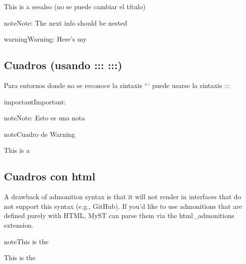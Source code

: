 \documentclass[letterpaper,10pt,english]{jupyterBook}
\begin{document}
\nopagebreak


\sphinxAtStartPar
This is a seealso (no se puede cambiar el título)



\begin{sphinxadmonition}{note}{Note:}
\sphinxAtStartPar
The next info should be nested

\begin{sphinxadmonition}{warning}{Warning:}
\sphinxAtStartPar
Here’s my 
\end{sphinxadmonition}
\end{sphinxadmonition}


\subsection{Cuadros (usando ::: :::)}
\label{\detokenize{docs/02_01_Cuadros:cuadros-usando}}
\sphinxAtStartPar
Para entornos donde no se reconoce la sintaxis
```
puede usarse la sintaxis
:::

\begin{sphinxadmonition}{important}{Important:}
\begin{sphinxadmonition}{note}{Note:}
\sphinxAtStartPar
Esto es una nota
\end{sphinxadmonition}
\end{sphinxadmonition}

\begin{sphinxadmonition}{note}{Cuadro de Warning}

\sphinxAtStartPar
This is a 
\end{sphinxadmonition}


\subsection{Cuadros con html}
\label{\detokenize{docs/02_01_Cuadros:cuadros-con-html}}
\sphinxAtStartPar
A drawback of admonition syntax is that it will not render in interfaces that do not support this syntax (e.g., GitHub). If you’d like to use admonitions that are defined purely with HTML, MyST can parse them via the html\_admonitions extension.

\begin{sphinxadmonition}{note}{This is the }

\sphinxAtStartPar
This is the 
\end{sphinxadmonition}
\end{document}
